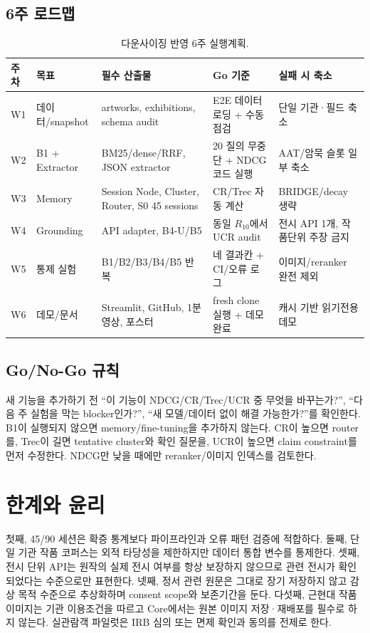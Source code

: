 \documentclass[10pt,a4paper,twocolumn]{article}
\begin{document}
\subsection{6주 로드맵}
\begin{table}[t]
\centering
\caption{다운사이징 반영 6주 실행계획.}
\small
\begin{tabularx}{0.97\textwidth}{@{}p{}p{}X p{}p{}@{}}
\toprule
주차 & 목표 & 필수 산출물 & Go 기준 & 실패 시 축소 \\
\midrule
W1 & 데이터/snapshot & artworks, exhibitions, schema audit & E2E 데이터 로딩 + 수동 점검 & 단일 기관·필드 축소 \\
W2 & B1 + Extractor & BM25/dense/RRF, JSON extractor & 20 질의 무중단 + NDCG 코드 실행 & AAT/암묵 슬롯 일부 축소 \\
W3 & Memory & Session Node, Cluster, Router, S0 45 sessions & CR/Trec 자동 계산 & BRIDGE/decay 생략 \\
W4 & Grounding & API adapter, B4-U/B5 & 동일 $R_{10}$에서 UCR audit & 전시 API 1개, 작품단위 주장 금지 \\
W5 & 통제 실험 & B1/B2/B3/B4/B5 반복 & 네 결과칸 + CI/오류 로그 & 이미지/reranker 완전 제외 \\
W6 & 데모/문서 & Streamlit, GitHub, 1분 영상, 포스터 & fresh clone 실행 + 데모 완료 & 캐시 기반 읽기전용 데모 \\
\bottomrule
\end{tabularx}
\end{table}

\subsection{Go/No-Go 규칙}
새 기능을 추가하기 전 ``이 기능이 NDCG/CR/Trec/UCR 중 무엇을 바꾸는가?'', ``다음 주 실험을 막는 blocker인가?'', ``새 모델/데이터 없이 해결 가능한가?''를 확인한다. B1이 실행되지 않으면 memory/fine-tuning을 추가하지 않는다. CR이 높으면 router를, Trec이 길면 tentative cluster와 확인 질문을, UCR이 높으면 claim constraint를 먼저 수정한다. NDCG만 낮을 때에만 reranker/이미지 인덱스를 검토한다.

\section{한계와 윤리}
첫째, 45/90 세션은 확증 통계보다 파이프라인과 오류 패턴 검증에 적합하다. 둘째, 단일 기관 작품 코퍼스는 외적 타당성을 제한하지만 데이터 통합 변수를 통제한다. 셋째, 전시 단위 API는 원작의 실제 전시 여부를 항상 보장하지 않으므로 관련 전시가 확인되었다는 수준으로만 표현한다. 넷째, 정서 관련 원문은 그대로 장기 저장하지 않고 감상 목적 수준으로 추상화하며 consent scope와 보존기간을 둔다. 다섯째, 근현대 작품 이미지는 기관 이용조건을 따르고 Core에서는 원본 이미지 저장·재배포를 필수로 하지 않는다. 실관람객 파일럿은 IRB 심의 또는 면제 확인과 동의를 전제로 한다.
\end{document}
